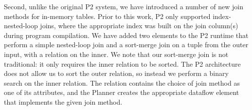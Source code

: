 Second, unlike the original P2 system, we have introduced a number of new join
methods for in-memory tables.  Prior to this work, P2 only supported
index-nested-loop joins, where the appropriate index was built on the join
column(s) during program compilation.  We have added two elements to the P2
runtime that perform a simple nested-loop join and a sort-merge join on a tuple
from the outer input, with a relation on the inner.  We note that our
sort-merge join is not traditional: it only requires the inner relation to be
sorted.  The P2 architecture does not allow us to sort the outer relation, so
instead we perform a binary search on the inner relation.  The 
relation contains the choice of join method as one of its attributes, and the
Planner creates the appropriate dataflow element that implements the given join
method.



